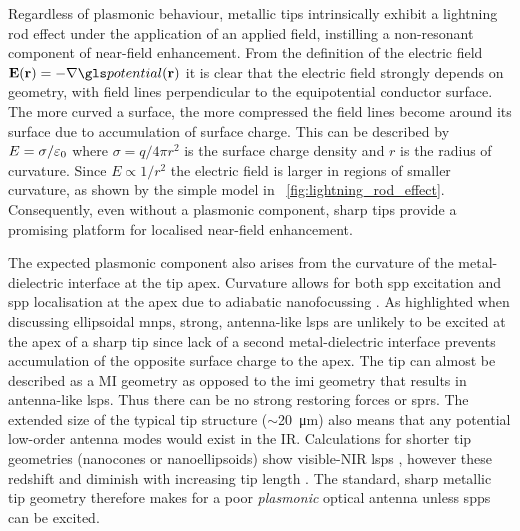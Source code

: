 \documentclass{article}
\begin{document}
Regardless of plasmonic behaviour, metallic tips intrinsically exhibit a lightning rod effect under the application of an applied field, instilling a non-resonant component of near-field enhancement. From the definition of the electric field $\vec{E}(\vec{r}) = -\nabla\pot(\vec{r})$ it is clear that the electric field strongly depends on geometry, with field lines perpendicular to the equipotential conductor surface. The more curved a surface, the more compressed the field lines become around its surface due to accumulation of surface charge. This can be described by $E = \sigma/\varepsilon_0$ where $\sigma = q/4\pi r^2$ is the surface charge density and $r$ is the radius of curvature. Since $E \propto 1/r^2$ the electric field is larger in regions of smaller curvature, as shown by the simple model in \figurename~\ref{fig:lightning_rod_effect}. Consequently, even without a plasmonic component, sharp tips provide a promising platform for localised near-field enhancement.

The expected plasmonic component also arises from the curvature of the metal-dielectric interface at the tip apex. Curvature allows for both \gls{spp} excitation and \gls{spp} localisation at the apex due to adiabatic nanofocussing \cite{stockman2004, pile2006, berweger2010, lee2011, berweger2012, lindquist2013}. As highlighted when discussing ellipsoidal \glspl{mnp}, strong, antenna-like \glspl{lsp} are unlikely to be excited at the apex of a sharp tip since lack of a second metal-dielectric interface prevents accumulation of the opposite surface charge to the apex. The tip can almost be described as a MI geometry as opposed to the \gls{imi} geometry that results in antenna-like \glspl{lsp}. Thus there can be no strong restoring forces or \glspl{spr}. The extended size of the typical tip structure ($\sim$\SI{20}{\micro\metre}) also means that any potential low-order antenna modes would exist in the IR. Calculations for shorter tip geometries (nanocones or nanoellipsoids) show visible-NIR \glspl{lsp} \cite{roth2006, goncharenko2006}, however these redshift and diminish with increasing tip length \cite{zhang2009, huber2014}. The standard, sharp metallic tip geometry therefore makes for a poor \textit{plasmonic} optical antenna unless \glspl{spp} can be excited.
\end{document}
